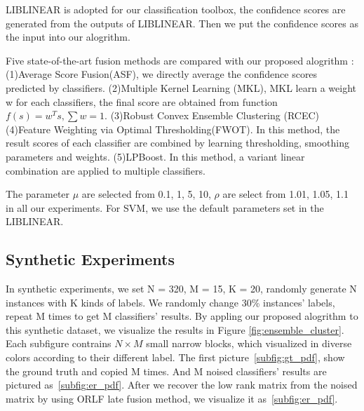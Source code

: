 \documentclass[letterpaper]{article}
\begin{document}
LIBLINEAR\cite{fan2008liblinear} is adopted for our classification toolbox, the confidence scores are generated from the outputs of LIBLINEAR. Then we put the confidence scores as the input into our alogrithm.

Five state-of-the-art fusion methods are compared with our proposed alogrithm : (1)Average Score Fusion(ASF), we directly average the confidence scores predicted by classifiers. (2)Multiple Kernel Learning (MKL),  MKL learn a weight w for each classifiers, the final score are obtained from function $f(s)=w^{T}s, \sum w = 1$. (3)Robust Convex Ensemble Clustering (RCEC)\cite{gaoijcai2016robust} (4)Feature Weighting via Optimal Thresholding(FWOT)\cite{xuiccv2013feature}. In this method, the result scores of each classifier are combined by learning thresholding, smoothing parameters and weights. (5)LPBoost\cite{gehler2009feature}. In this method, a variant linear combination are applied to multiple classifiers.

The parameter $\mu$ are selected from {0.1, 1, 5, 10}, $\rho$ are select from {1.01, 1.05, 1.1} in all our experiments. For SVM, we use the default parameters set in the LIBLINEAR.

\subsection{Synthetic Experiments}

In synthetic experiments, we set N = 320, M = 15, K = 20, randomly generate N instances with K kinds of labels. We randomly change 30\% instances' labels, repeat M times to get M classifiers' results. By appling our proposed alogrithm to this synthetic dataset, we visualize the results in Figure \ref{fig:ensemble_cluster}. Each subfigure contrains $N\times M$ small narrow blocks, which visualized in diverse colors according to their different label. The first picture~\ref{subfig:gt_pdf}, show the ground truth and copied M times. And M noised classifiers' results are pictured as~\ref{subfig:er_pdf}. After we recover the low rank matrix from the noised matrix by using ORLF late fusion method, we visualize it as~\ref{subfig:er_pdf}.
\end{document}
